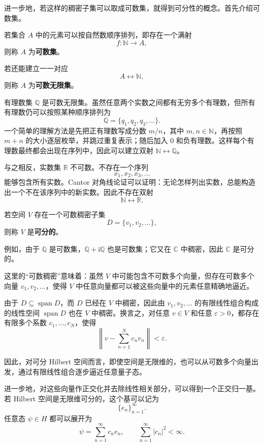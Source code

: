 \documentclass[UTF8,a4paper,11pt,openany]{ctexbook}
\begin{document}
进一步地，若这样的稠密子集可以取成可数集，就得到可分性的概念。首先介绍可数集。

\begin{definition}[可数集]
若集合 $A$ 中的元素可以按自然数顺序排列，即存在一个满射
\[
f:\mathbb N\to A,
\]
则称 $A$ 为\textbf{可数集}。

若还能建立一一对应
\[
A\longleftrightarrow\mathbb N,
\]
则称 $A$ 为\textbf{可数无限集}。
\end{definition}

有理数集 $\mathbb Q$ 是可数无限集。虽然任意两个实数之间都有无穷多个有理数，但所有有理数仍可以按照某种顺序排列为
\[
\mathbb Q
=
\{q_1,q_2,q_3,\ldots\}.
\]
一个简单的理解方法是先把正有理数写成分数 $m/n$，其中 $m,n\in\mathbb N$，再按照 $m+n$ 的大小逐层枚举，并跳过重复表示；随后加入 $0$ 和负有理数。这样每个有理数最终都会出现在序列中，因此可以建立双射 $\mathbb N\leftrightarrow\mathbb Q$。

与之相反，实数集 $\mathbb R$ 不可数。不存在一个序列
\[
x_1,x_2,x_3,\ldots
\]
能够包含所有实数。Cantor 对角线论证可以证明：无论怎样列出实数，总能构造出一个不在该序列中的新实数。因此不存在双射
\[
\mathbb N\leftrightarrow\mathbb R.
\]

\begin{definition}[可分空间]
若空间 $V$ 存在一个可数稠密子集
\[
D=\{v_1,v_2,\ldots\},
\]
则称 $V$ 是\textbf{可分的}。
\end{definition}

例如，由于 $\mathbb Q$ 是可数集，$\mathbb Q+\mathrm{i}\mathbb Q$ 也是可数集；它又在 $\mathbb C$ 中稠密，因此 $\mathbb C$ 是可分的。

这里的“可数稠密”意味着：虽然 $V$ 中可能包含不可数多个向量，但存在可数多个向量 $v_1,v_2,\ldots$，使得 $V$ 中任意向量都可以被这些向量中的元素任意精确地逼近。

由于 $D\subseteq\operatorname{span}D$，而 $D$ 已经在 $V$ 中稠密，因此由 $v_1,v_2,\ldots$ 的有限线性组合构成的线性空间 $\operatorname{span}D$ 也在 $V$ 中稠密。换言之，对任意 $v\in V$ 和任意 $\varepsilon>0$，都存在有限多个系数 $c_1,\ldots,c_N$，使得
\[
\left\|
v-\sum_{n=1}^{N}c_n v_n
\right\|
<\varepsilon.
\]

因此，对可分 Hilbert 空间而言，即使空间是无限维的，也可以从可数多个向量出发，通过有限线性组合逐步逼近任意量子态。

进一步地，对这些向量作正交化并去除线性相关部分，可以得到一个正交归一基。若 Hilbert 空间是无限维可分的，这个基可以记为
\[
\{e_n\}_{n=1}^{\infty}.
\]
任意态 $\psi\in H$ 都可以展开为
\[
\psi
=
\sum_{n=1}^{\infty}c_n e_n,
\qquad
\sum_{n=1}^{\infty}|c_n|^2<\infty.
\]
\end{document}
